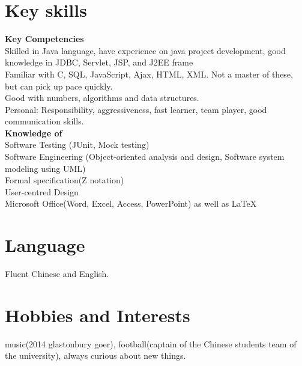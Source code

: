 \documentclass[margin]{res}
\begin{document}
\begin{resume}
\section{Key skills}
 {\bf  Key Competencies}\\
  Skilled in Java language, have experience on java project development, good
  knowledge in JDBC, Servlet, JSP, and J2EE frame\\  
  Familiar with C, SQL, JavaScript, Ajax, HTML, XML. Not a master
  of these, but can pick up pace quickly.\\
  Good with numbers, algorithms and data structures.\\
  Personal: Responsibility, aggressiveness, fast learner, team player, good
  communication skills.\\  
   {\bf Knowledge of}\\
  Software Testing (JUnit, Mock testing)\\
  Software Engineering (Object-oriented analysis and design,
  Software system modeling using UML)\\
  Formal specification(Z notation)\\
  User-centred Design\\
  Microsoft Office(Word, Excel, Access, PowerPoint)
  as well as \LaTeX \\

\section{Language} Fluent Chinese and English.
\section{Hobbies and Interests}
music(2014 glastonbury goer), football(captain of the Chinese students team of
the university), always curious about new things.
\end{resume} 
\end{document}
